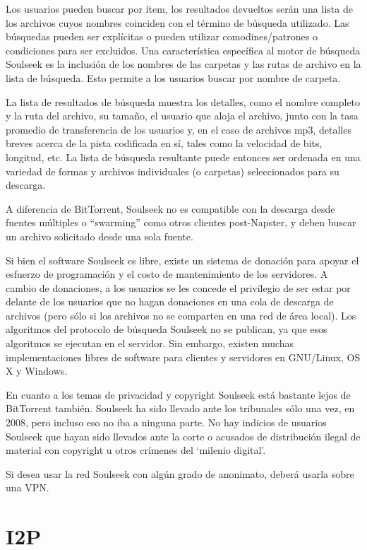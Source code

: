 \documentclass[10pt,a5paper,twoside,,]{book}
\begin{document}
Los usuarios pueden buscar por ítem, los resultados devueltos serán una
lista de los archivos cuyos nombres coinciden con el término de búsqueda
utilizado. Las búsquedas pueden ser explícitas o pueden utilizar
comodines/patrones o condiciones para ser excluidos. Una característica
específica al motor de búsqueda Soulseek es la inclusión de los nombres
de las carpetas y las rutas de archivo en la lista de búsqueda. Esto
permite a los usuarios buscar por nombre de carpeta.

La lista de resultados de búsqueda muestra los detalles, como el nombre
completo y la ruta del archivo, su tamaño, el usuario que aloja el
archivo, junto con la tasa promedio de transferencia de los usuarios y,
en el caso de archivos mp3, detalles breves acerca de la pista
codificada en sí, tales como la velocidad de bits, longitud, etc. La
lista de búsqueda resultante puede entonces ser ordenada en una variedad
de formas y archivos individuales (o carpetas) seleccionados para su
descarga.

A diferencia de BitTorrent, Soulseek no es compatible con la descarga
desde fuentes múltiples o ``swarming'' como otros clientes post-Napster,
y deben buscar un archivo solicitado desde una sola fuente.

Si bien el software Soulseek es libre, existe un sistema de donación
para apoyar el esfuerzo de programación y el costo de mantenimiento de
los servidores. A cambio de donaciones, a los usuarios se les concede el
privilegio de ser estar por delante de los usuarios que no hagan
donaciones en una cola de descarga de archivos (pero sólo si los
archivos no se comparten en una red de área local). Los algoritmos del
protocolo de búsqueda Soulseek no se publican, ya que esos algoritmos se
ejecutan en el servidor. Sin embargo, existen muchas implementaciones
libres de software para clientes y servidores en GNU/Linux, OS X y
Windows.

En cuanto a los temas de privacidad y copyright Soulseek está bastante
lejos de BitTorrent también. Soulseek ha sido llevado ante los
tribunales sólo una vez, en 2008, pero incluso eso no iba a ninguna
parte. No hay indicios de usuarios Soulseek que hayan sido llevados ante
la corte o acusados de distribución ilegal de material con copyright u
otros crímenes del `milenio digital'.

Si desea usar la red Soulseek con algún grado de anonimato, deberá
usarla sobre una VPN.

\section{I2P}\label{i2p}
\end{document}
